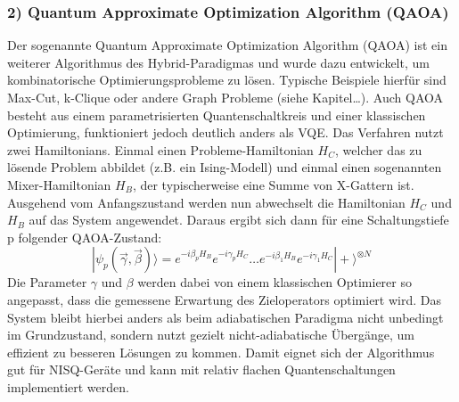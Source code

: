 \subsubsection*{2) Quantum Approximate Optimization Algorithm (QAOA)}
Der sogenannte Quantum Approximate Optimization Algorithm (QAOA) ist ein weiterer Algorithmus des Hybrid-Paradigmas und wurde dazu entwickelt, um kombinatorische Optimierungsprobleme zu lösen. Typische Beispiele hierfür sind Max-Cut, k-Clique oder andere Graph Probleme (siehe Kapitel…). Auch QAOA besteht aus einem parametrisierten Quantenschaltkreis und einer klassischen Optimierung, funktioniert jedoch deutlich anders als VQE.
Das Verfahren nutzt zwei Hamiltonians. Einmal einen Probleme-Hamiltonian $H_C$, welcher das zu lösende Problem abbildet (z.B. ein Ising-Modell) und einmal einen sogenannten Mixer-Hamiltonian $H_B$, der typischerweise eine Summe von X-Gattern ist. Ausgehend vom Anfangszustand werden nun abwechselt die Hamiltonian $H_C$ und $H_B$ auf das System angewendet. Daraus ergibt sich dann für eine Schaltungstiefe p folgender QAOA-Zustand: 
$$
|\psi_p(\vec{\gamma}, \vec{\beta})\rangle = e^{-i\beta_p H_B}e^{-i\gamma_p H_C} \dots e^{-i\beta_1 H_B}e^{-i\gamma_1 H_C} |+\rangle^{\otimes N}
$$
Die Parameter $\gamma$ und $\beta$ werden dabei von einem klassischen Optimierer so angepasst, dass die gemessene Erwartung des Zieloperators optimiert wird. Das System bleibt hierbei anders als beim adiabatischen Paradigma nicht unbedingt im Grundzustand, sondern nutzt gezielt nicht-adiabatische Übergänge, um effizient zu besseren Lösungen zu kommen. Damit eignet sich der Algorithmus gut für NISQ-Geräte und kann mit relativ flachen Quantenschaltungen implementiert werden. 

